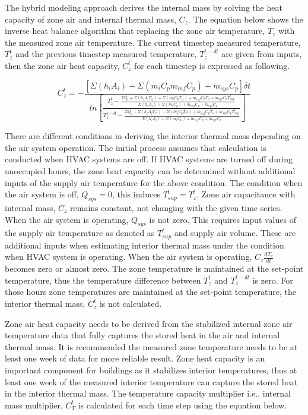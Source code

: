 The hybrid modeling approach derives the internal mass by solving the heat capacity of zone air and internal thermal mass, $C_z$. The equation below shows the inverse heat balance algorithm that replacing the zone air temperature, $T_z$ with the measured zone air temperature. The current timestep measured temperature, $T_z^t$  and the previous timestep measured temperature, $T_z^{t-\delta t}$ are given from inputs, then the zone air heat capacity, $C_z^t$ for each timestep is expressed as following. 

\begin{equation}
C_z^t = - \frac {[\Sigma (h_i A_i) + \Sigma (\dot{m}_i C_p \dot{m}_{inf} C_p) + \dot{m}_{sys} C_p ] \delta t}{ ln⁡ \left[ \frac { T_z^t - \frac { \Sigma Q_i +\Sigma (h_i A_i T_{si}) + \Sigma (\dot{m}_i C_p T_{zi}) + \dot{m}_{inf} C_p T_o + \dot{m}_{sys} C_p T_{sup}^t} {\Sigma (h_i A_i)  + \Sigma (\dot{m}_i C_p)  + \dot{m}_{inf} C_p + \dot{m}_{sys} C_p}} {T_z^{t-\delta t} - \frac {\Sigma Q_i +\Sigma (h_i A_i T_si)  + \Sigma (\dot{m}_i C_p T_zi) + \dot{m}_{inf} C_p T_o + \dot{m}_{sys} C_p T_{sup}^t} {\Sigma (h_i A_i) + \Sigma (\dot{m}_i C_p)  + \dot{m}_{inf} C_p + \dot{m}_{sys} C_p}} \right]}
\label{eq:ZoneAirHeatCapacityforEachTimestep}
\end{equation}

There are different conditions in deriving the interior thermal mass depending on the air system operation. The initial process assumes that calculation is conducted when HVAC systems are off. If HVAC systems are turned off during unoccupied hours, the zone heat capacity can be determined without additional inputs of the supply air temperature for the above condition. The condition when the air system is off, $Q_{sys}=0$, this induces $T_{sup}^t=T_z^t$.  Zone air capacitance with internal mass, $C_z$  remains constant, not changing with the given time series. When the air system is operating, $Q_{sys}$ is not zero. This requires input values of the supply air temperature as denoted as $T_{sup}^t$ and supply air volume. These are additional inputs when estimating interior thermal mass under the condition when HVAC system is operating. When the air system is operating, $C_z \frac {dT_z} {dt}$ becomes zero or almost zero. The zone temperature is maintained at the set-point temperature, thus the temperature difference between $T_z^t$  and $T_z^{t-\delta t}$ is zero. For those hours zone temperatures are maintained at the set-point temperature, the interior thermal mass, $C_z^t$ is not calculated. 

Zone air heat capacity needs to be derived from the stabilized internal zone air temperature data that fully captures the stored heat in the air and internal thermal mass. It is recommended the measured zone temperature needs to be at least one week of data for more reliable result. Zone heat capacity is an important component for buildings as it stabilizes interior temperatures, thus at least one week of the measured interior temperature can capture the stored heat in the interior thermal mass. The temperature capacity multiplier i.e., internal mass multiplier, $C_T^t$ is calculated for each time step using the equation below.



